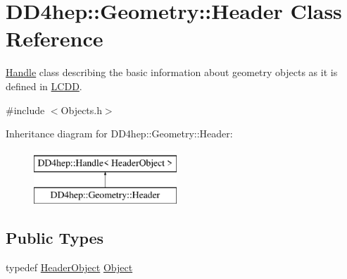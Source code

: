 \hypertarget{class_d_d4hep_1_1_geometry_1_1_header}{}\section{D\+D4hep\+:\+:Geometry\+:\+:Header Class Reference}
\label{class_d_d4hep_1_1_geometry_1_1_header}


\hyperlink{class_d_d4hep_1_1_handle}{Handle} class describing the basic information about geometry objects as it is defined in \hyperlink{class_d_d4hep_1_1_geometry_1_1_l_c_d_d}{L\+C\+DD}.  




{\ttfamily \#include $<$Objects.\+h$>$}

Inheritance diagram for D\+D4hep\+:\+:Geometry\+:\+:Header\+:\begin{figure}[H]
\begin{center}
\leavevmode
\includegraphics[height=2.000000cm]{class_d_d4hep_1_1_geometry_1_1_header}
\end{center}
\end{figure}
\subsection*{Public Types}
\begin{DoxyCompactItemize}
\item 
typedef \hyperlink{class_d_d4hep_1_1_geometry_1_1_header_object}{Header\+Object} \hyperlink{class_d_d4hep_1_1_geometry_1_1_header_a8cb46876d46f57257201a561bb1e0795}{Object}
\end{DoxyCompactItemize}
